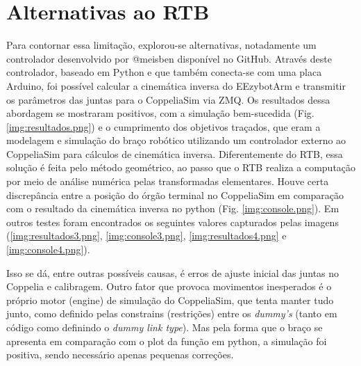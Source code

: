 \section{Alternativas ao RTB}
Para contornar essa limitação, explorou-se alternativas, notadamente um controlador desenvolvido por @meisben \cite{MoneyCoomes2021} disponível no GitHub. Através deste controlador, baseado em Python e que também conecta-se com uma placa Arduino, foi possível calcular a cinemática inversa do EEzybotArm e transmitir os parâmetros das juntas para o CoppeliaSim via ZMQ. Os resultados dessa abordagem se mostraram positivos, com a simulação bem-sucedida (Fig. \ref{img:resultados.png}) e o cumprimento dos objetivos traçados, que eram a modelagem e simulação do braço robótico utilizando um controlador externo ao CoppeliaSim para cálculos de cinemática inversa. Diferentemente do RTB, essa solução é feita pelo método geométrico, ao passo que o RTB realiza a computação por meio de análise numérica pelas transformadas elementares. Houve certa discrepância entre a posição do órgão terminal no CoppeliaSim em comparação com o resultado da cinemática inversa no python (Fig. \ref{img:console.png}). Em outros testes foram encontrados os seguintes valores capturados pelas imagens (\ref{img:resultados3.png}, \ref{img:console3.png}, \ref{img:resultados4.png} e \ref{img:console4.png}).





Isso se dá, entre outras possíveis causas, é erros de ajuste inicial das juntas no Coppelia e calibragem. Outro fator que provoca movimentos inesperados é o próprio motor (engine) de simulação do CoppeliaSim, que tenta manter tudo junto, como definido pelas constrains (restrições) entre os \textit{dummy's} (tanto em código como definindo o \textit{dummy link type}). Mas pela forma que o braço se apresenta em comparação com o plot da função em python, a simulação foi positiva, sendo necessário apenas pequenas correções.



